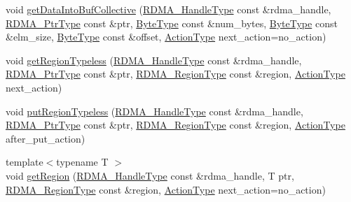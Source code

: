\begin{DoxyCompactItemize}
\item 
void \hyperlink{structvt_1_1rdma_1_1_r_d_m_a_manager_a68bf3378ec4132a81b728c180aa63686}{get\+Data\+Into\+Buf\+Collective} (\hyperlink{namespacevt_a10442579ec4e7ebef223818e64bcf908}{R\+D\+M\+A\+\_\+\+Handle\+Type} const \&rdma\+\_\+handle, \hyperlink{namespacevt_a9e2c953286c7616f7c218e9951790776}{R\+D\+M\+A\+\_\+\+Ptr\+Type} const \&ptr, \hyperlink{namespacevt_aab8d55968084610ce3b17057981e9300}{Byte\+Type} const \&num\+\_\+bytes, \hyperlink{namespacevt_aab8d55968084610ce3b17057981e9300}{Byte\+Type} const \&elm\+\_\+size, \hyperlink{namespacevt_aab8d55968084610ce3b17057981e9300}{Byte\+Type} const \&offset, \hyperlink{namespacevt_ae0a5a7b18cc99d7b732cb4d44f46b0f3}{Action\+Type} next\+\_\+action=no\+\_\+action)
\item 
void \hyperlink{structvt_1_1rdma_1_1_r_d_m_a_manager_a108e405a633745d46c2d68a1a0727b7c}{get\+Region\+Typeless} (\hyperlink{namespacevt_a10442579ec4e7ebef223818e64bcf908}{R\+D\+M\+A\+\_\+\+Handle\+Type} const \&rdma\+\_\+handle, \hyperlink{namespacevt_a9e2c953286c7616f7c218e9951790776}{R\+D\+M\+A\+\_\+\+Ptr\+Type} const \&ptr, \hyperlink{structvt_1_1rdma_1_1_r_d_m_a_manager_aafc574f533ebf5b34c1389ef504448bf}{R\+D\+M\+A\+\_\+\+Region\+Type} const \&region, \hyperlink{namespacevt_ae0a5a7b18cc99d7b732cb4d44f46b0f3}{Action\+Type} next\+\_\+action)
\item 
void \hyperlink{structvt_1_1rdma_1_1_r_d_m_a_manager_a2e34becca8d5f72a7d460e6574f8f623}{put\+Region\+Typeless} (\hyperlink{namespacevt_a10442579ec4e7ebef223818e64bcf908}{R\+D\+M\+A\+\_\+\+Handle\+Type} const \&rdma\+\_\+handle, \hyperlink{namespacevt_a9e2c953286c7616f7c218e9951790776}{R\+D\+M\+A\+\_\+\+Ptr\+Type} const \&ptr, \hyperlink{structvt_1_1rdma_1_1_r_d_m_a_manager_aafc574f533ebf5b34c1389ef504448bf}{R\+D\+M\+A\+\_\+\+Region\+Type} const \&region, \hyperlink{namespacevt_ae0a5a7b18cc99d7b732cb4d44f46b0f3}{Action\+Type} after\+\_\+put\+\_\+action)
\item 
{\footnotesize template$<$typename T $>$ }\\void \hyperlink{structvt_1_1rdma_1_1_r_d_m_a_manager_a06506f3abad91d02456d88f4b1e4db1b}{get\+Region} (\hyperlink{namespacevt_a10442579ec4e7ebef223818e64bcf908}{R\+D\+M\+A\+\_\+\+Handle\+Type} const \&rdma\+\_\+handle, T ptr, \hyperlink{structvt_1_1rdma_1_1_r_d_m_a_manager_aafc574f533ebf5b34c1389ef504448bf}{R\+D\+M\+A\+\_\+\+Region\+Type} const \&region, \hyperlink{namespacevt_ae0a5a7b18cc99d7b732cb4d44f46b0f3}{Action\+Type} next\+\_\+action=no\+\_\+action)
\item 

\end{DoxyCompactItemize}
